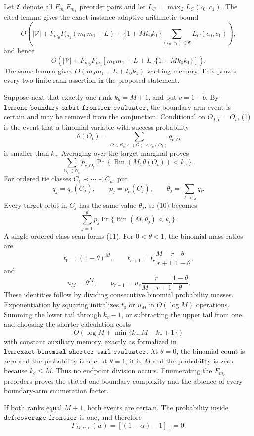 Let \(\mathfrak C\) denote all \(F_{m_0}F_{m_1}\) preorder pairs and let \(L_C=\max_{\mathfrak C}L_C(c_0,c_1)\). The cited lemma gives the exact instance-adaptive arithmetic bound
\[
O\!\left(
|\mathcal V|+F_{m_0}F_{m_1}(m_0m_1+L)
+\{1+Mk_0k_1\}
\sum_{(c_0,c_1)\in\mathfrak C}L_C(c_0,c_1)
\right),
\tag{7}
\]
and hence
\[
O\!\left(|\mathcal V|+F_{m_0}F_{m_1}
\left[m_0m_1+L+L_C\{1+Mk_0k_1\}\right]\right).
\tag{8}
\]
The same lemma gives \(O(m_0m_1+L+k_0k_1)\) working memory. This proves every two-finite-rank assertion in the proposed statement.

Suppose next that exactly one rank \(k_b=M+1\), and put \(c=1-b\). By \(\texttt{lem:one-boundary-orbit-frontier-evaluator}\), the boundary-arm event is certain and may be removed from the conjunction. Conditional on \(O_{T,c}=O_t\), (1) is the event that a binomial variable with success probability
\[
\theta(O_t)=\sum_{O\in\mathcal O_c:s_c(O)<s_c(O_t)}q_{c,O}
\tag{9}
\]
is smaller than \(k_c\). Averaging over the target marginal proves
\[
\sum_{O_t\in\mathcal O_c}p_{c,O_t}
\Pr\!\left\{\operatorname{Bin}(M,\theta(O_t))<k_c\right\}.
\tag{10}
\]
For ordered tie classes \(C_1\prec\cdots\prec C_d\), put
\[
q_j=q_c(C_j),\qquad p_j=p_c(C_j),\qquad
\theta_j=\sum_{\ell<j}q_\ell.
\tag{11}
\]
Every target orbit in \(C_j\) has the same value \(\theta_j\), so (10) becomes
\[
\sum_{j=1}^d p_j\Pr\{\operatorname{Bin}(M,\theta_j)<k_c\}.
\tag{12}
\]
A single ordered-class scan forms (11). For \(0<\theta<1\), the binomial mass ratios are
\[
t_0=(1-\theta)^M,\qquad
t_{r+1}=t_r\frac{M-r}{r+1}\frac{\theta}{1-\theta},
\tag{13}
\]
and
\[
u_M=\theta^M,\qquad\nu_{r-1}=u_r\frac{r}{M-r+1}\frac{1-\theta}{\theta}.
\tag{14}
\]
These identities follow by dividing consecutive binomial probability masses. Exponentiation by squaring initializes \(t_0\) or \(u_M\) in \(O(\log M)\) operations. Summing the lower tail through \(k_c-1\), or subtracting the upper tail from one, and choosing the shorter calculation costs
\[
O\!\left(\log M+\min\{k_c,M-k_c+1\}\right)
\tag{15}
\]
with constant auxiliary memory, exactly as formalized in \(\texttt{lem:exact-binomial-shorter-tail-evaluator}\). At \(\theta=0\), the binomial count is zero and the probability is one; at \(\theta=1\), it is \(M\) and the probability is zero because \(k_c\le M\). Thus no endpoint division occurs. Enumerating the \(F_{m_c}\) preorders proves the stated one-boundary complexity and the absence of every boundary-arm enumeration factor.

If both ranks equal \(M+1\), both events are certain. The probability inside \(\texttt{def:coverage-frontier}\) is one, and therefore
\[
\Gamma_{M,\alpha,\boldsymbol\varepsilon}(w)=[(1-\alpha)-1]_+=0.
\tag{16}
\]

